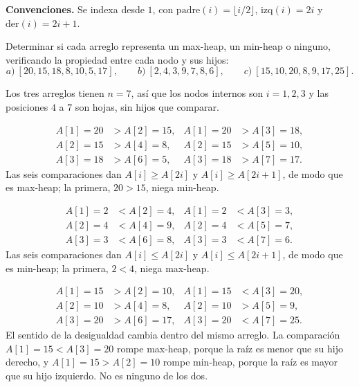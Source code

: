\documentclass[11pt,letterpaper]{article}
\begin{document}

\noindent\textbf{Convenciones.}
Se indexa desde $1$, con $\mathrm{padre}(i) = \lfloor i/2
\rfloor$, $\mathrm{izq}(i) = 2i$ y $\mathrm{der}(i) = 2i + 1$.

\noindent Determinar si cada arreglo representa un max-heap, un
min-heap o ninguno, verificando la propiedad entre cada nodo y sus
hijos:
\[
  a)\ [20, 15, 18, 8, 10, 5, 17], \qquad
  b)\ [2, 4, 3, 9, 7, 8, 6], \qquad
  c)\ [15, 10, 20, 8, 9, 17, 25].
\]

Los tres arreglos tienen $n = 7$, así que los nodos internos son
$i = 1, 2, 3$ y las posiciones $4$ a $7$ son hojas, sin hijos que
comparar.

\begin{align*}
  A[1] = 20 &> A[2] = 15, & A[1] = 20 &> A[3] = 18, \\
  A[2] = 15 &> A[4] = 8,  & A[2] = 15 &> A[5] = 10, \\
  A[3] = 18 &> A[6] = 5,  & A[3] = 18 &> A[7] = 17.
\end{align*}
Las seis comparaciones dan $A[i] \geq A[2i]$ y $A[i] \geq A[2i + 1]$,
de modo que es max-heap; la primera, $20 > 15$, niega min-heap.

\begin{align*}
  A[1] = 2 &< A[2] = 4, & A[1] = 2 &< A[3] = 3, \\
  A[2] = 4 &< A[4] = 9, & A[2] = 4 &< A[5] = 7, \\
  A[3] = 3 &< A[6] = 8, & A[3] = 3 &< A[7] = 6.
\end{align*}
Las seis comparaciones dan $A[i] \leq A[2i]$ y $A[i] \leq A[2i + 1]$,
de modo que es min-heap; la primera, $2 < 4$, niega max-heap.

\begin{align*}
  A[1] = 15 &> A[2] = 10, & A[1] = 15 &< A[3] = 20, \\
  A[2] = 10 &> A[4] = 8,  & A[2] = 10 &> A[5] = 9,  \\
  A[3] = 20 &> A[6] = 17, & A[3] = 20 &< A[7] = 25.
\end{align*}
El sentido de la desigualdad cambia dentro del mismo arreglo. La
comparación $A[1] = 15 < A[3] = 20$ rompe max-heap, porque la raíz es
menor que su hijo derecho, y $A[1] = 15 > A[2] = 10$ rompe min-heap,
porque la raíz es mayor que su hijo izquierdo. No es ninguno de los
dos.

\end{document}
